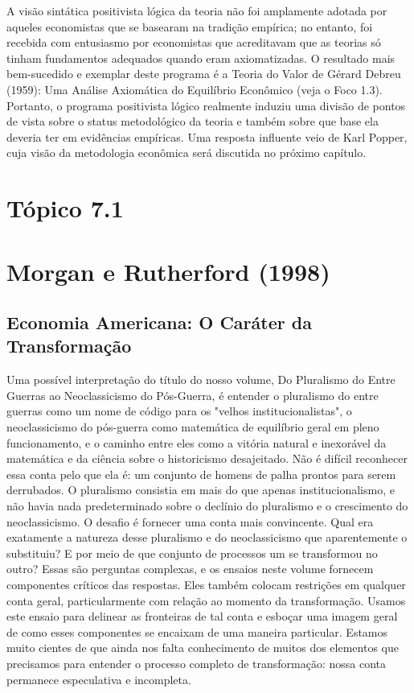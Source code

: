 \documentclass[12pt]{article}
\begin{document}
A visão sintática positivista lógica da teoria não foi amplamente adotada por aqueles economistas que se basearam na tradição empírica; no entanto, foi recebida com entusiasmo por economistas que acreditavam que as teorias só tinham fundamentos adequados quando eram axiomatizadas. O resultado mais bem-sucedido e exemplar deste programa é a Teoria do Valor de Gérard Debreu (1959): Uma Análise Axiomática do Equilíbrio Econômico (veja o Foco 1.3). Portanto, o programa positivista lógico realmente induziu uma divisão de pontos de vista sobre o status metodológico da teoria e também sobre que base ela deveria ter em evidências empíricas. Uma resposta influente veio de Karl Popper, cuja visão da metodologia econômica será discutida no próximo capítulo.

\newpage
\section*{\textbf{Tópico 7.1}}
\section{\textbf{Morgan e Rutherford (1998)}}
\subsection{\textbf{Economia Americana: O Caráter da Transformação}}

Uma possível interpretação do título do nosso volume, Do Pluralismo do Entre Guerras ao Neoclassicismo do Pós-Guerra, é entender o pluralismo do entre guerras como um nome de código para os "velhos institucionalistas", o neoclassicismo do pós-guerra como matemática de equilíbrio geral em pleno funcionamento, e o caminho entre eles como a vitória natural e inexorável da matemática e da ciência sobre o historicismo desajeitado. Não é difícil reconhecer essa conta pelo que ela é: um conjunto de homens de palha prontos para serem derrubados. O pluralismo consistia em mais do que apenas institucionalismo, e não havia nada predeterminado sobre o declínio do pluralismo e o crescimento do neoclassicismo. O desafio é fornecer uma conta mais convincente. Qual era exatamente a natureza desse pluralismo e do neoclassicismo que aparentemente o substituiu? E por meio de que conjunto de processos um se transformou no outro? Essas são perguntas complexas, e os ensaios neste volume fornecem componentes críticos das respostas. Eles também colocam restrições em qualquer conta geral, particularmente com relação ao momento da transformação. Usamos este ensaio para delinear as fronteiras de tal conta e esboçar uma imagem geral de como esses componentes se encaixam de uma maneira particular. Estamos muito cientes de que ainda nos falta conhecimento de muitos dos elementos que precisamos para entender o processo completo de transformação: nossa conta permanece especulativa e incompleta.
\end{document}
